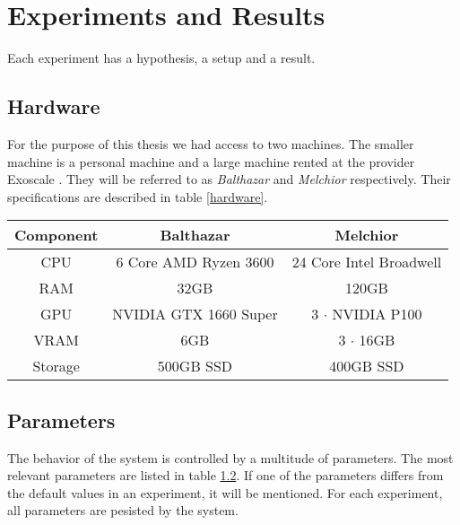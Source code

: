 \chapter{Experiments and Results}
\label{experiments-and-results}

Each experiment has a hypothesis, a setup and a result.

\section{Hardware}
For the purpose of this thesis we had access to two machines. The smaller machine is a personal machine and a large machine rented at the provider Exoscale \cite{noauthor_exoscale_nodate}. They will be referred to as \textit{Balthazar} and \textit{Melchior} respectively. Their specifications are described in table \ref{hardware}.

\begin{table*}
    \begin{center}
        \begin{tabular}{ c|c|c }
            Component & Balthazar             & Melchior                \\
            \hline
            \hline
            CPU       & 6 Core AMD Ryzen 3600 & 24 Core Intel Broadwell \\
            RAM       & 32GB                  & 120GB                   \\
            GPU       & NVIDIA GTX 1660 Super & 3 $\cdot$ NVIDIA P100   \\
            VRAM      & 6GB                   & 3 $\cdot$ 16GB          \\
            Storage   & 500GB SSD             & 400GB SSD               \\
        \end{tabular}
    \end{center}
    \caption{Hardware specifications of the utilized machines}
    \label{hardware}
\end{table*}

\section{Parameters}
\label{parameters}
The behavior of the system is controlled by a multitude of parameters. The most relevant parameters are listed in table \ref{parameters}. If one of the parameters differs from the default values in an experiment, it will be mentioned. For each experiment, all parameters are pesisted by the system.

